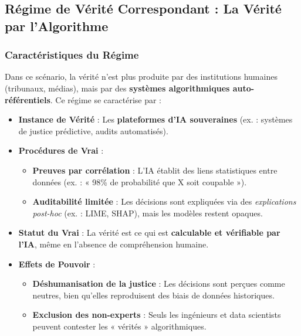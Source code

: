 \documentclass[a4paper,12pt]{report}
\begin{document}
	\subsection*{Régime de Vérité Correspondant : La Vérité par l’Algorithme}
	\subsubsection{Caractéristiques du Régime}
	Dans ce scénario, la vérité n’est plus produite par des institutions humaines (tribunaux, médias), mais par des \textbf{systèmes algorithmiques auto-référentiels}. Ce régime se caractérise par :
	\begin{itemize}
		\item \textbf{Instance de Vérité} : Les \textbf{plateformes d’IA souveraines} (ex. : systèmes de justice prédictive, audits automatisés).
		\item \textbf{Procédures de Vrai} :
		\begin{itemize}
			\item \textbf{Preuves par corrélation} : L’IA établit des liens statistiques entre données (ex. : « 98\% de probabilité que X soit coupable »).
			\item \textbf{Auditabilité limitée} : Les décisions sont expliquées via des \textit{explications post-hoc} (ex. : LIME, SHAP), mais les modèles restent opaques.
		\end{itemize}
		\item \textbf{Statut du Vrai} : La vérité est ce qui est \textbf{calculable et vérifiable par l’IA}, même en l’absence de compréhension humaine.
		\item \textbf{Effets de Pouvoir} :
		\begin{itemize}
			\item \textbf{Déshumanisation de la justice} : Les décisions sont perçues comme neutres, bien qu’elles reproduisent des biais de données historiques.
			\item \textbf{Exclusion des non-experts} : Seuls les ingénieurs et data scientists peuvent contester les « vérités » algorithmiques.
		\end{itemize}
	\end{itemize}
	
\end{document}
